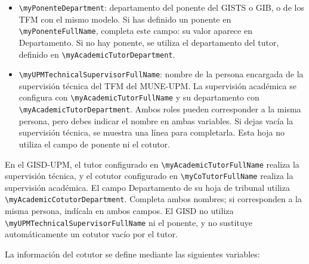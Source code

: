 \begin{itemize}
  \item \texttt{\textbackslash{}myPonenteDepartment}: departamento del ponente del GISTS o GIB, o de los TFM con el mismo modelo. Si has definido un ponente en \texttt{\textbackslash{}myPonenteFullName}, completa este campo: su valor aparece en Departamento. Si no hay ponente, se utiliza el departamento del tutor, definido en \texttt{\textbackslash{}myAcademicTutorDepartment}.
  \item \texttt{\textbackslash{}myUPMTechnicalSupervisorFullName}: nombre de la persona encargada de la supervisión técnica del TFM del MUNE-UPM. La supervisión académica se configura con \texttt{\textbackslash{}myAcademicTutorFullName} y su departamento con \texttt{\textbackslash{}myAcademicTutorDepartment}. Ambos roles pueden corresponder a la misma persona, pero debes indicar el nombre en ambas variables. Si dejas vacía la supervisión técnica, se muestra una línea para completarla. Esta hoja no utiliza el campo de ponente ni el cotutor.
\end{itemize}

En el GISD-UPM, el tutor configurado en \texttt{\textbackslash{}myAcademicTutorFullName} realiza la supervisión técnica, y el cotutor configurado en \texttt{\textbackslash{}myCoTutorFullName} realiza la supervisión académica. El campo Departamento de su hoja de tribunal utiliza \texttt{\textbackslash{}myAcademicCotutorDepartment}. Completa ambos nombres; si corresponden a la misma persona, indícala en ambos campos. El GISD no utiliza \texttt{\textbackslash{}myUPMTechnicalSupervisorFullName} ni el ponente, y no sustituye automáticamente un cotutor vacío por el tutor.

La información del cotutor se define mediante las siguientes variables:

